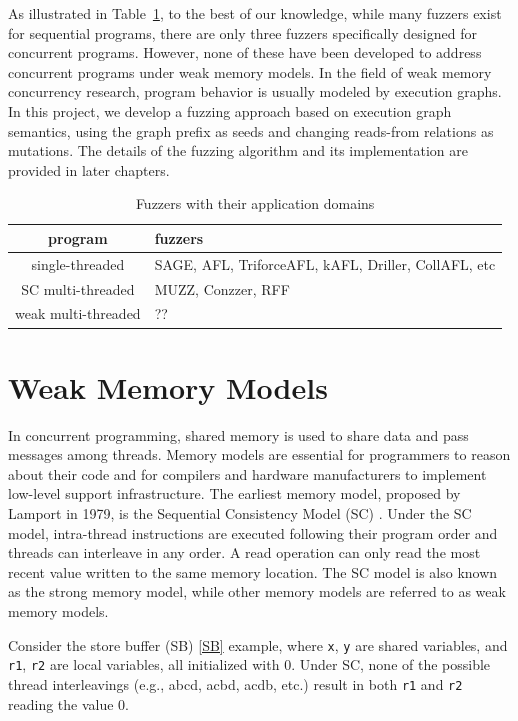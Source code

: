 As illustrated in Table~\ref{fuzzer-domains}, to the best of our knowledge, while many fuzzers exist for sequential programs, there are only three fuzzers specifically designed for concurrent programs. However, none of these have been developed to address concurrent programs under weak memory models. In the field of weak memory concurrency research, program behavior is usually modeled by execution graphs. In this project, we develop a fuzzing approach based on execution graph semantics, using the graph prefix as seeds and changing reads-from relations as mutations. The details of the fuzzing algorithm and its implementation are provided in later chapters.


\begin{table}[h!]
	\centering
	\begin{tabular}{ |c|l| }
		\hline
		program             & fuzzers                                             \\
		\hline
		single-threaded     & SAGE, AFL, TriforceAFL, kAFL, Driller, CollAFL, etc \\
		SC multi-threaded   & MUZZ, Conzzer, RFF                             \\
		weak multi-threaded & ??                                                  \\
		\hline
	\end{tabular}
	\caption{Fuzzers with their application domains}
	\label{fuzzer-domains}
\end{table}

\section{Weak Memory Models}

In concurrent programming, shared memory is used to share data and pass messages among threads. Memory models are essential for programmers to reason about their code and for compilers and hardware manufacturers to implement low-level support infrastructure. The earliest memory model, proposed by Lamport\cite{SC} in 1979, is the Sequential Consistency Model (SC) . Under the SC model, intra-thread instructions are executed following their program order and threads can interleave in any order. A read operation can only read the most recent value written to the same memory location. The SC model is also known as the strong memory model, while other memory models are referred to as weak memory models.

Consider the store buffer (SB) \ref{SB} example, where \texttt{x}, \texttt{y} are shared variables, and \texttt{r1}, \texttt{r2} are local variables, all initialized with 0. Under SC, none of the possible thread interleavings (e.g., abcd, acbd, acdb, etc.) result in both \texttt{r1} and \texttt{r2} reading the value 0.

